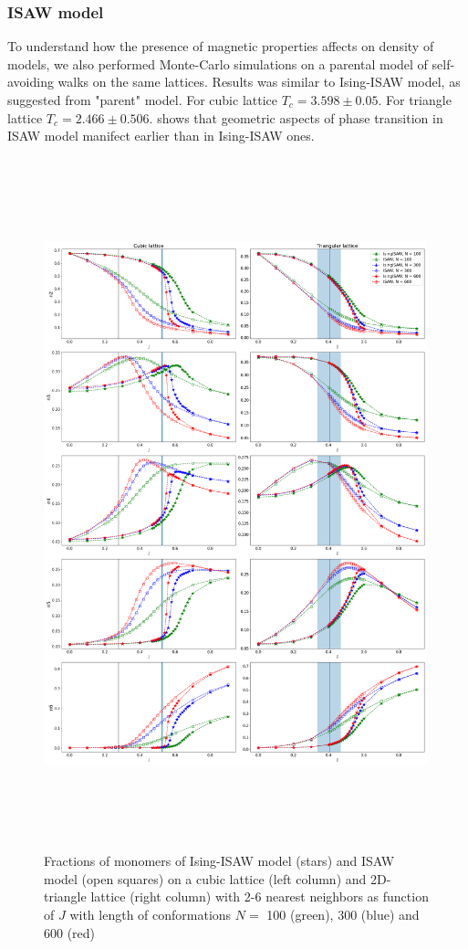 \documentclass[a4paper]{jpconf}
\begin{document}
\subsubsection{ISAW model}

To understand how the presence of magnetic properties affects on density of models, we also performed Monte-Carlo simulations on a parental model of self-avoiding walks on the same lattices. Results was similar to Ising-ISAW model, as suggested from "parent" model. For cubic lattice $T_{c} = 3.598 \pm 0.05 $\cite{Tesi1996}. For triangle lattice $T_{c} = 2.466 \pm 0.506 $\cite{Privman1986}.  shows that geometric aspects of phase transition in ISAW model manifect earlier than in Ising-ISAW ones.  

\begin{figure}
    \centering
    \includegraphics[width=0.99\textwidth, height=20cm]{Images/Ising_vs_ISAW.png}
    \caption{Fractions of monomers of Ising-ISAW model (stars) and ISAW model (open squares) on a cubic lattice (left column) and 2D-triangle lattice (right column) with 2-6 nearest neighbors as function of $J$ with length of conformations $N = $ 100 (green), 300 (blue) and 600 (red)}
    \label{fig:Ising_vs_ISAW}
\end{figure}
\end{document}
